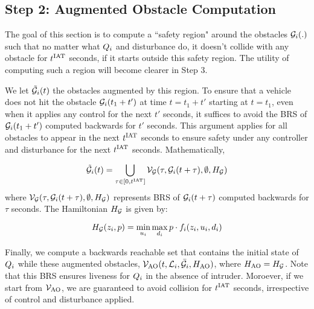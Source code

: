 \subsection{Step 2: Augmented Obstacle Computation}
The goal of this section is to compute a ``safety region" around the obstacles $\mathcal{G}_i(.)$ such that no matter what $Q_{i}$ and disturbance do, it doesn't collide with any obstacle for $t^\text{IAT}$ seconds, if it starts outside this safety region. The utility of computing such a region will become clearer in Step 3. 

We let $\tilde{\mathcal{G}}_i(t)$ the obstacles augmented by this region. To ensure that a vehicle does not hit the obstacle $\mathcal{G}_i(t_1 + t')$ at time $t = t_1 + t'$ starting at $t = t_1$, even when it applies any control for the next $t'$ seconds, it suffices to avoid the BRS of $\mathcal{G}_i(t_1 + t')$ computed backwards for $t'$ seconds. This argument applies for all obstacles to appear in the next $t^\text{IAT}$ seconds to ensure safety under any controller and disturbance for the next $t^\text{IAT}$ seconds. Mathematically,

\begin{equation} \label{eqn:inducedobs}
\tilde{\mathcal{G}}_i(t) = \bigcup_{\tau \in [0, t^\text{IAT}]} \mathcal{V}_{\mathcal{G}}(\tau, \mathcal{G}_i(t+\tau), \emptyset, H_{\mathcal{G}})
\end{equation}
where $\mathcal{V}_{\mathcal{G}}(\tau, \mathcal{G}_i(t+\tau), \emptyset, H_{\mathcal{G}})$ represents BRS of $\mathcal{G}_i(t+\tau)$ computed backwards for $\tau$ seconds. The Hamiltonian 
$H_{\mathcal{G}}$ is given by:

\begin{equation} \label{eqn:BRSham}
H_{\mathcal{G}}(z_i, p) = \min_{u_i} \max_{d_i} p \cdot f_i (z_i, u_i, d_i)
\end{equation}

Finally, we compute a backwards reachable set that contains the initial state of $Q_{i}$ while these augmented obstacles, $\mathcal{V}_\text{AO}(t, \mathcal{L}_i, \bar{\mathcal{G}}_i, H_\text{AO})$, where $H_\text{AO} = H_{\mathcal{G}}$. Note that this BRS ensures liveness for $Q_{i}$ in the absence of intruder. Moroever, if we start from $\mathcal{V}_\text{AO}$, we are guaranteed to avoid collision for $t^\text{IAT}$ seconds, irrespective of control and disturbance applied. 
